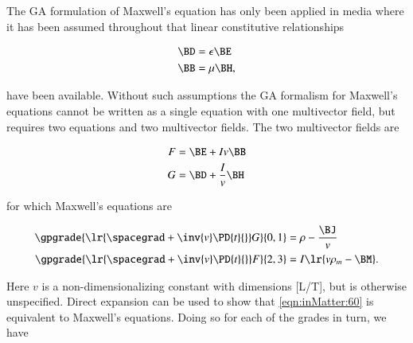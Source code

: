 %
%
The GA formulation of Maxwell's equation has only been applied in media where it has been assumed throughout that linear constitutive relationships

\begin{dmath}\label{eqn:inMatter:20}
\begin{aligned}
\BD &= \epsilon \BE \\
\BB &= \mu \BH,
\end{aligned}
\end{dmath}

have been available.  Without such assumptions the GA formalism for Maxwell's equations cannot be written as a single equation with one multivector field, but requires two equations and two multivector fields.  The two multivector fields are

\begin{dmath}\label{eqn:inMatter:40}
\begin{aligned}
F &= \BE + I v \BB \\
G &= \BD + \frac{I}{v} \BH
\end{aligned}
\end{dmath}

for which Maxwell's equations are

\begin{dmath}\label{eqn:inMatter:60}
\begin{aligned}
\gpgrade{ \lr{ \spacegrad + \inv{v} \PD{t}{} } G }{0,1} &= \rho - \frac{\BJ}{v} \\
\gpgrade{ \lr{ \spacegrad + \inv{v} \PD{t}{} } F }{2,3} &= I \lr{ v \rho_m - \BM }.
\end{aligned}
\end{dmath}

Here \( v \) is a non-dimensionalizing constant with dimensions [L/T], but is otherwise unspecified.
Direct expansion can be used to show that \cref{eqn:inMatter:60} is equivalent to Maxwell's equations.
Doing so for each of the grades in turn, we have


